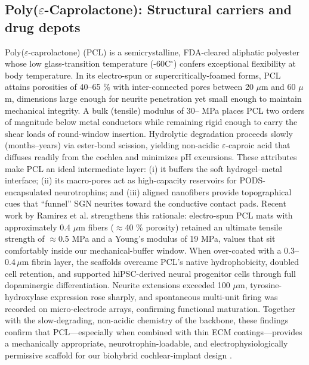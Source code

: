 \documentclass[referee,pdflatex, sn-vancouver-num]{sn-jnl}%
\theoremstyle{thmstyleone}%
\theoremstyle{thmstyletwo}%
\theoremstyle{thmstylethree}%
\DeclareRobustCommand{\textendash}{\ifmmode\text{-}\else\leavevmode\hbox{--}\fi}
\begin{document}
\subsection{Poly(\texorpdfstring{$\varepsilon$}{epsilon}-Caprolactone): Structural carriers and drug depots}
Poly($\varepsilon$-caprolactone) (PCL) is a semicrystalline, FDA-cleared aliphatic polyester whose low glass-transition temperature (-60C$^{\circ}$) confers exceptional flexibility at body temperature. In its electro-spun or supercritically-foamed forms, PCL attains porosities of 40–65 \% with inter-connected pores between 20 $\mu$m and 60 $\mu$m, dimensions large enough for neurite penetration yet small enough to maintain mechanical integrity. A bulk (tensile) modulus of 30\textendash 60 MPa places PCL two orders of magnitude below metal conductors while remaining rigid enough to carry the shear loads of round-window insertion. Hydrolytic degradation proceeds slowly (months–years) via ester-bond scission, yielding non-acidic $\varepsilon$-caproic acid that diffuses readily from the cochlea and minimizes pH excursions. These attributes make PCL an ideal intermediate layer: (i) it buffers the soft hydrogel–metal interface; (ii) its macro-pores act as high-capacity reservoirs for PODS-encapsulated neurotrophins; and (iii) aligned nanofibers provide topographical cues that “funnel” SGN neurites toward the conductive contact pads. Recent work by Ramirez et al. \cite{Ramirez2024} strengthens this rationale: electro-spun PCL mats with approximately 0.4 $\mu$m fibers ($\approx$40 \% porosity) retained an ultimate tensile strength of $\approx$0.5 MPa and a Young’s modulus of 19 MPa, values that sit comfortably inside our mechanical-buffer window. When over-coated with a 0.3–0.4\,$\mu$m fibrin layer, the scaffolds overcame PCL’s native hydrophobicity, doubled cell retention, and supported hiPSC-derived neural progenitor cells through full dopaminergic differentiation. Neurite extensions exceeded 100 $\mu$m, tyrosine-hydroxylase expression rose sharply, and spontaneous multi-unit firing was recorded on micro-electrode arrays, confirming functional maturation. Together with the slow-degrading, non-acidic chemistry of the backbone, these findings confirm that PCL—especially when combined with thin ECM coatings—provides a mechanically appropriate, neurotrophin-loadable, and electrophysiologically permissive scaffold for our biohybrid cochlear-implant design \cite{Li2007,Friend2011}.
\end{document}
